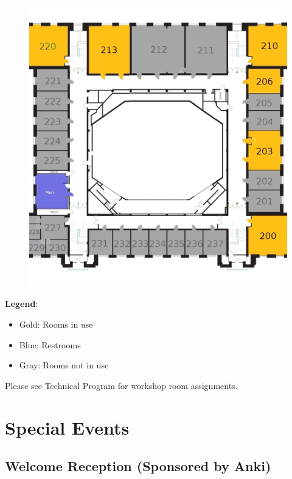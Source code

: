 \begin{figure}[h!]
\center
\includegraphics[height=0.6\textheight]{local_img/maps/second_floor_edited}
\end{figure}

\vspace{0.3cm}

{\Large \textbf{Legend}: 
\begin{itemize}
\itemsep0em 
\item Gold: Rooms in use 
\item Blue: Restrooms
\item Gray: Rooms not in use
\end{itemize}
}

\vspace{0.3cm}
{\Large Please see Technical Program for workshop room assignments.}


\newpage
{} \section{Special Events}
\vspace{0.2cm}

\subsection*{Welcome Reception (Sponsored by Anki)}

